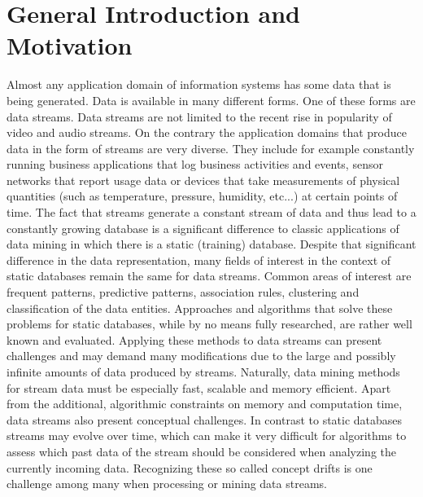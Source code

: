 \section{General Introduction and Motivation}
Almost any application domain of information systems has some data that is being generated. Data is available in many different forms. One of these forms are data streams. Data streams are not limited to the recent rise in popularity of video and audio streams. On the contrary the application domains that produce data in the form of streams are very diverse. They include for example constantly running business applications that log business activities and events, sensor networks that report usage data or devices that take measurements of physical quantities (such as temperature, pressure, humidity, etc...) at certain points of time. \newline
The fact that streams generate a constant stream of data and thus lead to a constantly growing database is a significant difference to classic applications of data mining in which there is a static (training) database. Despite that significant difference in the data representation, many fields of interest in the context of static databases remain the same for data streams. Common areas of interest are frequent patterns, predictive patterns, association rules, clustering and classification of the data entities. Approaches and algorithms that solve these problems for static databases, while by no means fully researched, are rather well known and evaluated. Applying these methods to data streams can present challenges and may demand many modifications due to the large and possibly infinite amounts of data produced by streams. Naturally, data mining methods for stream data must be especially fast, scalable and memory efficient. \newline
Apart from the additional, algorithmic constraints on memory and computation time, data streams also present conceptual challenges. In contrast to static databases streams may evolve over time, which can make it very difficult for algorithms to assess which past data of the stream should be considered when analyzing the currently incoming data. Recognizing these so called concept drifts is one challenge among many when processing or mining data streams. \newline
